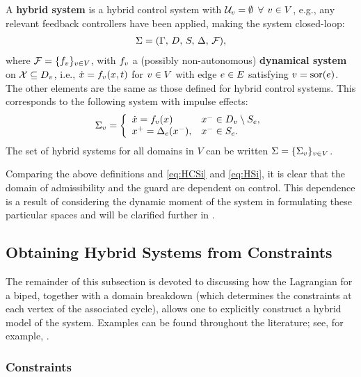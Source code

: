 \begin{definition}
  A {\bf hybrid system} is a hybrid control system with $\mathcal{U}_{v} = \emptyset$
  $\forall$ $v \in V$, e.g., any relevant feedback controllers have been
  applied, making the system closed-loop:
  \begin{align*}
    \Sigma = (\Gamma, \, D, \, S, \, \Delta, \, \mathcal{F}),
  \end{align*}
  where $\mathcal{F} = \{f_{v}\}_{v \in V}$, with $f_{v}$ a (possibly non-autonomous) {\bf
    dynamical system} on $\mathcal{X} \subseteq D_{v}$, i.e., ${\dot {x}} = f_{v}(x, t)$ for
  $v \in V$ with edge $e \in E$ satisfying $v = \mathrm{sor}(e)$.
  The other elements are the same as those defined for hybrid control systems.
  This corresponds to the following system with impulse effects:
  \begin{align}
    \label{eq:HSi}
    \Sigma_{v} = \left\{
      \begin{array}{l l}
        {\dot {x}} = f_{v}(x) & x^{-} \in D_{v} \setminus S_{e},\\
        x^{+} = \Delta_{e}(x^{-}), & x^{-} \in S_{e}.
      \end{array}\right.
  \end{align}
  The set of hybrid systems for all domains in $V$ can be written $\Sigma =
  \{\Sigma_{v}\}_{v \in V}$.
\end{definition}

Comparing the above definitions and \eqref{eq:HCSi} and \eqref{eq:HSi}, it is
clear that the domain of admissibility and the guard are dependent on control.
%
This dependence is a result of considering the dynamic moment of the system in
formulating these particular spaces and will be clarified further in
.


\subsection{Obtaining Hybrid Systems from Constraints}

The remainder of this subsection is devoted to discussing how the Lagrangian for
a biped, together with a domain breakdown (which determines the constraints at
each vertex of the associated cycle), allows one to explicitly construct a
hybrid model of the system.
%
Examples can be found throughout the literature; see, for example,
\cite{Grizzle2010, Grizzle2014, Sinnet2009}.


\subsubsection{Constraints}

